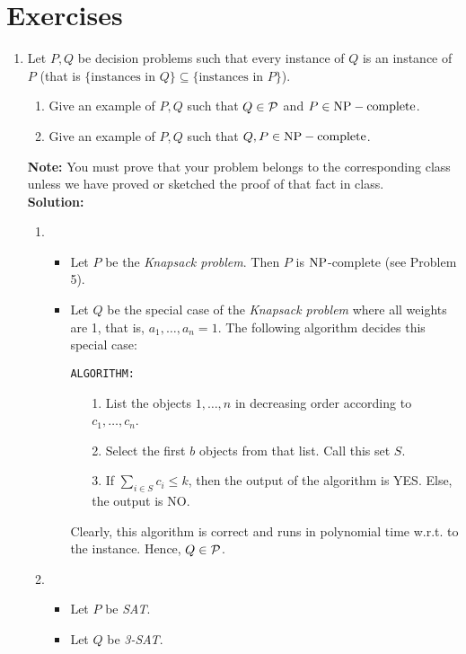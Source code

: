 \documentclass[../open-optimization/open-optimization.tex]{subfiles}
\begin{document}
\section{Exercises}

\begin{enumerate}
\item Let $P,Q$ be decision problems such that every instance of $Q$ is an instance of $P$ {\color{black}(that is $\{\text{instances in $Q$}\}\subseteq \{\text{instances in $P$}\}$)}.
\begin{enumerate}
	\item Give an example of $P,Q$ such that $Q\in {\mathcal{P}}$ and $P\in \text{NP}-\text{complete}$. 
		\item Give an example of $P,Q$ such that $Q,P\in \text{NP}-\text{complete}$. 
\end{enumerate} 

{\bf Note:} You must prove that your problem belongs to the corresponding class unless we have proved or sketched the proof of that fact in class.\\ 

{\bf \Large Solution:}\\

\begin{enumerate}
	\item \begin{itemize}
		\item Let $P$ be the {\em Knapsack problem}. Then $P$ is $\text{NP}$-complete (see Problem 5).
		\item Let $Q$ be the special case of the {\em Knapsack problem} where all weights are 1, that is, $a_1,\dots,a_n=1$. The following algorithm decides this special case:
		
			{\tt ALGORITHM:}
			
			\begin{itemize}
				\item[1.] List the objects $1,\dots,n$ in decreasing order according to $c_1,\dots,c_n$.
				\item[2.] Select the first $b$ objects from that list. Call this set $S$.
				\item[3.] If $\sum_{i\in S}c_i\leq k$, then  the output of the algorithm is YES. Else, the output is NO. 
			\end{itemize}
			
			Clearly, this algorithm is correct and runs in polynomial time w.r.t. to the instance. Hence, $Q\in{\mathcal{P}}$.
			
	\end{itemize}
	\item \begin{itemize}
		\item Let $P$ be {\em SAT}.
		\item Let $Q$ be {\em 3-SAT}.
	\end{itemize}
	

\end{enumerate}
\end{enumerate}
\end{document}

